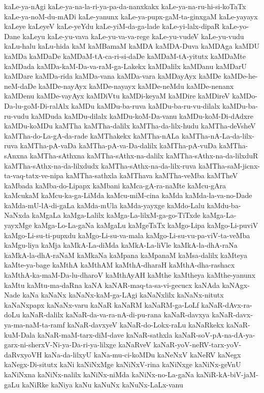 {kaLe-ya-nAgi
kaLe-ya-na-la-ri-ya-pa-da-nanxkakx
kaLe-ya-na-ru-hi-si-koTaTx
kaLe-ya-noM-du-mADi
kaLe-yanunx
kaLe-ya-pupx-gaM-ta-ginxgaM
kaLe-yayayx
kaLeye
kaLeyeV
kaLe-yeYdu
kaLe-yiM-da-ga-lade
kaLe-yi-lalx-dipaR
kaLe-yo-Dane
kaLeyu
kaLe-yu-vava
kaLe-yu-va-va-rege
kaLe-yu-vudeV
kaLe-yu-vudu
kaLu-halu
kaLu-hida
kaM
kaMBamaM
kaMDA
kaMDA-Duva
kaMDAga
kaMDU
kaMDa
kaMDaDe
kaMDaM-tA-ca-ri-si-daDe
kaMDaM-tA-yitutx
kaMDaMte
kaMDada
kaMDa-kaM-Da-va-raM-ga-Lakekx
kaMDalilx
kaMDanu
kaMDarU
kaMDare
kaMDa-rida
kaMDa-vana
kaMDa-vara
kaMDayAyx
kaMDe
kaMDe-he-neM-daDe
kaMDe-nayAyx
kaMDe-nayayx
kaMDe-neMdu
kaMDe-nenanx
kaMDenu
kaMDe-vayAyx
kaMDiVtu
kaMDi-keyaM
kaMDire
kaMDireV
kaMDo-Da-lu-goM-Di-ralAlx
kaMDu
kaMDu-ba-ruva
kaMDu-ba-ru-vu-dilalx
kaMDu-ba-ru-vudu
kaMDuda
kaMDu-dilalx
kaMDu-koM-Da-vanu
kaMDu-koM-Di-dAdxre
kaMDu-koMDu
kaMTha
kaMTha-dalilx
kaMTha-da-lilx-hudu
kaMTha-deVsheV
kaMTha-do-La-gA-da-rade
kaMThakekx
kaMTha-nALa
kaMTha-nA-La-da-lilx-ruva
kaMTha-pA-vaDa
kaMTha-pA-va-Da-dalilx
kaMTha-pA-vuDa
kaMTha-sAnxna
kaMTha-sAthxna
kaMTha-sAthx-na-dalilx
kaMTha-sAthx-na-da-lilxduR
kaMTha-sAthx-na-da-lilxdudx
kaMTha-sAthx-na-da-lilx-ruva
kaMTha-saM-jicnx-ta-vaq-tatx-ve-nipa
kaMTha-sathxla
kaMThava
kaMTha-veMba
kaMTheV
kaMbada
kaMba-do-Lipapx
kaMbani
kaMca-gA-ra-naMte
kaMcu-gAra
kaMcukaM
kaMcu-ka-ga-LiMda
kaMcu-miM-cina
kaMda
kaMda-la-va-no-Dade
kaMda-mU-lA-di-gaLa
kaMda-mUla
kaMda-yayxge
kaMdo-Lalu
kaMdu-ba-NaNxda
kaMgaLa
kaMga-Lalilx
kaMga-La-lilxM-ga-go-TiTxde
kaMga-La-yayxMge
kaMga-Lo-La-gaNa
kaMgaLu
kaMgeTaTx
kaMgo-Lipa
kaMgo-Li-puviV
kaMgo-Li-su-ti-pupxdu
kaMgo-Li-su-va-mala
kaMgo-Li-su-vu-pa-viV-ta-veMba
kaMgu-liya
kaMja
kaMkA-La-diMda
kaMkA-La-liVle
kaMkA-la-dhA-raNa
kaMkA-la-dhA-raNaM
kaMkaNa
kaMpana
kaMpanaM
kaMsa-dalilx
kaMteya
kaMte-ya-bage
kaMthA
kaMthAM
kaMthA-dharaH
kaMthA-dha-rashacx
kaMthA-ka-maM-Da-lu-dharoV
kaMthAyAH
kaMthe
kaMtheya
kaMthe-yanunx
kaMtu
kaMtu-ma-daRna
kaNA
kaNAR-maq-ta-sa-vi-gecucx
kaNAda
kaNAgx-Nade
kaNa
kaNaNx
kaNaNx-kaM-ga-LAgi
kaNaNxlilx
kaNaNx-nitutx
kaNaNxpapx
kaNaNx-varu
kaNaR
kaNaRM
kaNaRM-ga-LoLf
kaNaR-dAvx-ra-doLu
kaNaR-dalilx
kaNaR-da-va-ra-nA-di-pu-rana
kaNaR-davxya
kaNaR-davx-ya-ma-naM-ta-ramf
kaNaR-davxyeV
kaNaR-do-Lokx-raLu
kaNaRkekx
kaNaR-kuM-Dala
kaNaR-maM-tarx-diM-dave
kaNaR-sathxla
kaNaR-soV-pA-na-dA-ya-garx-ni-sherxV-Ni-ya-Da-ri-ya-lilxge
kaNaRveV
kaNaR-yoV-neRV-tarx-yoV-daRvxyoVH
kaNa-da-lilxyU
kaNa-mu-ci-koMDu
kaNeNxV
kaNeRV
kaNegx
kaNegx-Di-situtx
kaNi
kaNiNxMge
kaNiNxV-rina
kaNiNxge
kaNiNx-geVnU
kaNiNxna
kaNiNx-nalilx
kaNiNx-niMda
kaNiNx-no-La-gaNa
kaNiR-kA-biV-jaM-gaLu
kaNiRke
kaNiya
kaNu
kaNuNx
kaNuNx-LaLx-vanu
}
